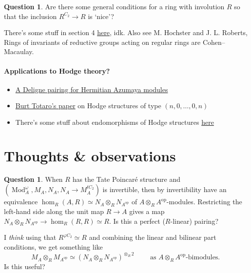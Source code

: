\documentclass{article}
\DeclareMathOperator{\Mod}{Mod} %
\newcommand{\op}{\mathrm{op}}
\theoremstyle{definition}
\newtheorem{question}[theorem]{Question}
\begin{document}
\begin{question}
    Are there some general conditions for a ring with involution $ R $ so that the inclusion $ R^{C_2} \to R $ is `nice'?

    There's some stuff in section 4 \href{https://www.math.nagoya-u.ac.jp/~hasimoto/paper/knop2.pdf}{here}, idk. 
    Also see M. Hochster and J. L. Roberts, Rings of invariants of reductive groups acting on regular rings are Cohen–Macaulay. 
\end{question}

\paragraph{Applications to Hodge theory?} 
\begin{itemize}
    \item \href{https://arxiv.org/abs/1501.05294}{A Deligne pairing for Hermitian Azumaya modules}
    \item \href{https://www.math.ucla.edu/~totaro/papers/public_html/structure.pdf}{Burt Totaro's paper} on Hodge structures of type $ (n,0,\ldots, 0, n) $
    \item There's some stuff about endomorphisms of Hodge structures \href{https://webusers.imj-prg.fr/~claire.voisin/Articlesweb/verbanianotes.pdf}{here}
\end{itemize}

\section{Thoughts \& observations}
\begin{question}
   When $ R $ has the Tate Poincaré structure and $ (\Mod_A^\omega, M_A, N_A, N_A \to M_A^{tC_2}) $ is invertible, then by invertibility have an equivalence $ \hom_R(A, R)\simeq N_A\otimes_R N_{A^\op} $ of $ A \otimes_R A^\op $-modules. 
   Restricting the left-hand side along the unit map $ R \to A $ gives a map $ N_A \otimes_R N_{A^\op} \to \hom_R(R,R) \simeq R $. 
   Is this a perfect ($R$-linear) pairing? 

   I \emph{think} using that $ R^{\varphi C_2} \simeq R $ and combining the linear and bilinear part conditions, we get something like
   \begin{equation*}
       M_A \otimes_R M_{A^\op} \simeq (N_A \otimes_R N_{A^\op})^{\otimes_R 2} \qquad \text{ as $A \otimes_R A^\op$-bimodules. }
   \end{equation*}
   Is this useful?
\end{question}
\end{document}
